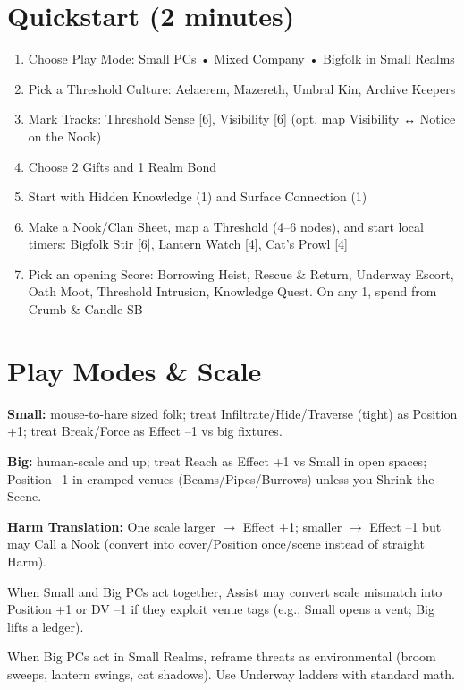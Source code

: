\documentclass[11pt]{book}
\begin{document}
\section{Quickstart (2 minutes)}
\begin{enumerate}
    \item Choose Play Mode: Small PCs • Mixed Company • Bigfolk in Small Realms
    \item Pick a Threshold Culture: Aelaerem, Mazereth, Umbral Kin, Archive Keepers
    \item Mark Tracks: Threshold Sense [6], Visibility [6] (opt. map Visibility ↔ Notice on the Nook)
    \item Choose 2 Gifts and 1 Realm Bond
    \item Start with Hidden Knowledge (1) and Surface Connection (1)
    \item Make a Nook/Clan Sheet, map a Threshold (4--6 nodes), and start local timers: Bigfolk Stir [6], Lantern Watch [4], Cat's Prowl [4]
    \item Pick an opening Score: Borrowing Heist, Rescue \& Return, Underway Escort, Oath Moot, Threshold Intrusion, Knowledge Quest. On any 1, spend from Crumb \& Candle SB
\end{enumerate}

\section{Play Modes \& Scale}
\textbf{Small:} mouse-to-hare sized folk; treat Infiltrate/Hide/Traverse (tight) as Position +1; treat Break/Force as Effect --1 vs big fixtures.

\textbf{Big:} human-scale and up; treat Reach as Effect +1 vs Small in open spaces; Position --1 in cramped venues (Beams/Pipes/Burrows) unless you Shrink the Scene.

\textbf{Harm Translation:} One scale larger $\rightarrow$ Effect +1; smaller $\rightarrow$ Effect --1 but may Call a Nook (convert into cover/Position once/scene instead of straight Harm).

When Small and Big PCs act together, Assist may convert scale mismatch into Position +1 or DV --1 if they exploit venue tags (e.g., Small opens a vent; Big lifts a ledger).

When Big PCs act in Small Realms, reframe threats as environmental (broom sweeps, lantern swings, cat shadows). Use Underway ladders with standard math.
\end{document}
